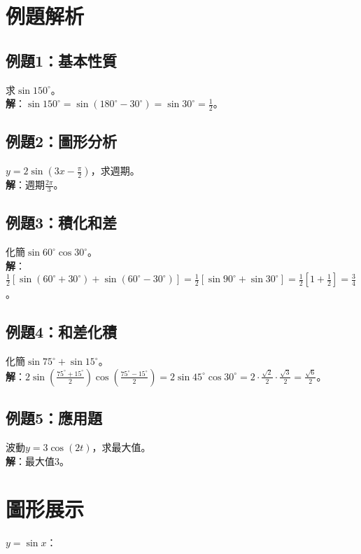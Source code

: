 \section{例題解析}

\subsection{例題1：基本性質}
求$\sin 150^\circ$。\\
\textbf{解}：$\sin 150^\circ = \sin(180^\circ - 30^\circ) = \sin 30^\circ = \frac{1}{2}$。

\subsection{例題2：圖形分析}
$y = 2 \sin(3x - \frac{\pi}{2})$，求週期。\\
\textbf{解}：週期$\frac{2\pi}{3}$。

\subsection{例題3：積化和差}
化簡$\sin 60^\circ \cos 30^\circ$。\\
\textbf{解}：$\frac{1}{2} [\sin(60^\circ + 30^\circ) + \sin(60^\circ - 30^\circ)] = \frac{1}{2} [\sin 90^\circ + \sin 30^\circ] = \frac{1}{2} [1 + \frac{1}{2}] = \frac{3}{4}$。

\subsection{例題4：和差化積}
化簡$\sin 75^\circ + \sin 15^\circ$。\\
\textbf{解}：$2 \sin\left(\frac{75^\circ + 15^\circ}{2}\right) \cos\left(\frac{75^\circ - 15^\circ}{2}\right) = 2 \sin 45^\circ \cos 30^\circ = 2 \cdot \frac{\sqrt{2}}{2} \cdot \frac{\sqrt{3}}{2} = \frac{\sqrt{6}}{2}$。

\subsection{例題5：應用題}
波動$y = 3 \cos(2t)$，求最大值。\\
\textbf{解}：最大值$3$。

\section{圖形展示}
$y = \sin x$：

